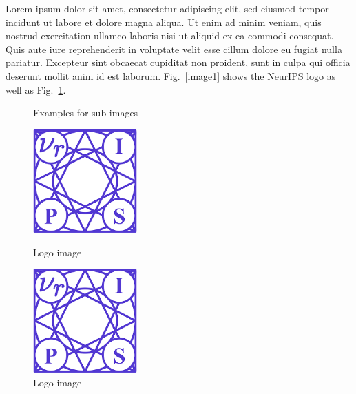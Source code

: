 \documentclass{article}
\begin{document}
Lorem ipsum dolor sit amet, consectetur adipiscing elit, sed eiusmod tempor incidunt ut labore et dolore magna aliqua. Ut enim ad minim veniam, quis nostrud exercitation ullamco laboris nisi ut aliquid ex ea commodi consequat. Quis aute iure reprehenderit in voluptate velit esse cillum dolore eu fugiat nulla pariatur. Excepteur sint obcaecat cupiditat non proident, sunt in culpa qui officia deserunt mollit anim id est laborum. Fig.~\ref{image1} shows the NeurIPS logo as well as Fig.~\ref{image2}.


\begin{figure}[H]
\centering
{} \quad \quad 
{} \quad
\caption{Examples for sub-images} \label{image2}
\end{figure}


\begin{figure}[H]
  \centering
  \begin{minipage}[b]{40mm}
    \includegraphics[width=40mm]{images/logo-neurips.png}
    \caption{Logo image}
    \label{image3}
  \end{minipage} 
  \quad \quad \quad \quad \quad
  \begin{minipage}[b]{40mm}
    \includegraphics[width=40mm]{images/logo-neurips.png}
    \caption{Logo image}
    \label{image4}
  \end{minipage}
\end{figure}
\end{document}
